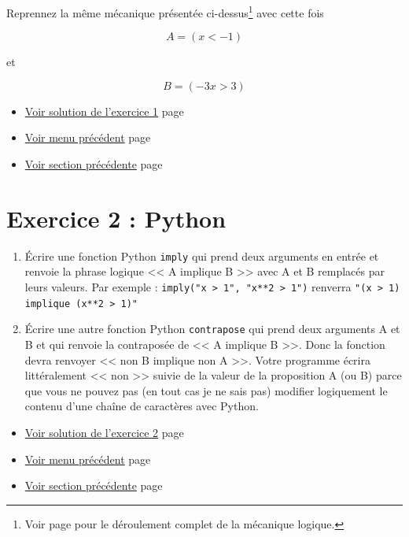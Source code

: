\documentclass[a4paper,11pt]{book}
\begin{document}
Reprennez la même mécanique présentée ci-dessus\footnote{Voir page \pageref{page:sec2.1.6cp} pour le
déroulement complet de la mécanique logique.} avec
cette fois

\[A = (x < -1)\]

et

\[B = (-3x > 3)\]


\begin{itemize}
\item \hyperref[org51c56ef]{Voir solution de l'exercice 1}
page~\pageref{page:sec8.1.1sol1}
\item \hyperref[orga5086f2]{Voir menu précédent}
page~\pageref{page:content1-menu}
\item \hyperref[org084e38f]{Voir section précédente}
page~\pageref{page:sec2.1.6cp}
\end{itemize}

\clearpage

\section{Exercice 2 : Python}
\label{sec:orgb908829}
\label{orgce66a51}
\label{page:sec2.1.8exo2}

\begin{enumerate}
\item Écrire une fonction Python \texttt{imply} qui prend
deux arguments en entrée et renvoie la phrase logique << A implique
B >> avec A et B remplacés par leurs valeurs.
Par exemple : \texttt{imply("x > 1", "x**2 > 1")} renverra \texttt{"(x > 1)
   implique (x**2 > 1)"}

\item Écrire une autre fonction Python \texttt{contrapose} qui prend deux
arguments A et B et qui renvoie la contraposée de << A implique
B >>. Donc la fonction devra renvoyer << non B implique non A >>. Votre
programme écrira littéralement << non >> suivie de la valeur de la
proposition A (ou B) parce que vous ne pouvez pas (en tout cas je
ne sais pas) modifier logiquement le contenu d'une chaîne de
caractères avec Python.
\end{enumerate}


\begin{itemize}
\item \hyperref[orged5d56d]{Voir solution de l'exercice 2}
page~\pageref{page:sec8.1.2sol2}
\item \hyperref[orga5086f2]{Voir menu précédent}
page~\pageref{page:content1-menu}
\item \hyperref[orgfd91183]{Voir section précédente}
page~\pageref{page:sec2.1.7exo1}
\end{itemize}
\end{document}
